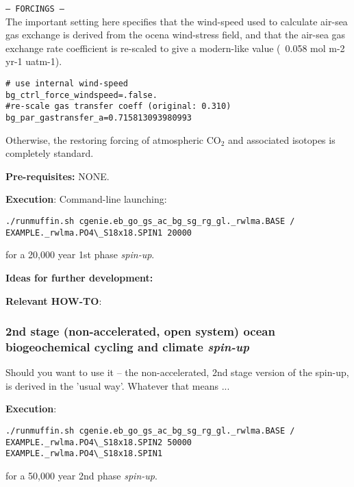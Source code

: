 \documentclass[10pt,twoside]{article}
\begin{document}
\begin{compactitem}
        \item \texttt{--- FORCINGS ---}
        \\ The important setting here specifies that the wind-speed used to calculate air-sea gas exchange is derived from the ocena wind-stress field, and that the air-sea gas exchange rate coefficient is re-scaled to give a modern-like value (~0.058 mol m-2 yr-1 uatm-1).
                        \vspace{-5pt}\begin{verbatim}
# use internal wind-speed
bg_ctrl_force_windspeed=.false.
#re-scale gas transfer coeff (original: 0.310)
bg_par_gastransfer_a=0.715813093980993
                \end{verbatim}\vspace{-5pt}
Otherwise, the restoring forcing of atmospheric CO\(_{2}\) and associated isotopes is completely standard.

\end{compactitem}

\noindent \textbf{Pre-requisites:} NONE.

\noindent \textbf{Execution}: Command-line launching:
\vspace{-5pt}\begin{verbatim}./runmuffin.sh cgenie.eb_go_gs_ac_bg_sg_rg_gl._rwlma.BASE /
EXAMPLE._rwlma.PO4\_S18x18.SPIN1 20000\end{verbatim}\vspace{-5pt}
for a 20,000 year 1st phase \textit{spin-up}.

\noindent \textbf{Ideas for further development:} 

\noindent \textbf{Relevant HOW-TO}:


\subsubsection{2nd stage (non-accelerated, open system) ocean biogeochemical cycling and climate \textit{spin-up}}\label{EXAMPLE.rwlma.PO4S18x18.SPIN2}

Should you want to use it -- the non-accelerated, 2nd stage version of the spin-up, is derived in the 'usual way'. Whatever that means ...

\noindent \textbf{Execution}:
\vspace{-5pt}\begin{verbatim}./runmuffin.sh cgenie.eb_go_gs_ac_bg_sg_rg_gl._rwlma.BASE /
EXAMPLE._rwlma.PO4\_S18x18.SPIN2 50000 EXAMPLE._rwlma.PO4\_S18x18.SPIN1\end{verbatim}\vspace{-5pt}
for a 50,000 year 2nd phase \textit{spin-up}.
\end{document}
